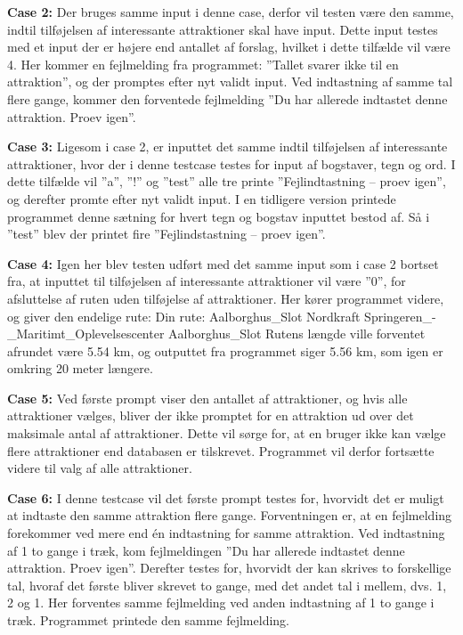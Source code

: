\textbf{Case 2:} \newline
Der bruges samme input i denne case, derfor vil testen være den samme, indtil tilføjelsen af interessante attraktioner skal have input. Dette input testes med et input der er højere end antallet af forslag, hvilket i dette tilfælde vil være 4. Her kommer en fejlmelding fra programmet: ”Tallet svarer ikke til en attraktion”, og der promptes efter nyt validt input. Ved indtastning af samme tal flere gange, kommer den forventede fejlmelding ”Du har allerede indtastet denne attraktion. Proev igen”.

\textbf{Case 3:} \newline
Ligesom i case 2, er inputtet det samme indtil tilføjelsen af interessante attraktioner, hvor der i denne testcase testes for input af bogstaver, tegn og ord. I dette tilfælde vil ”a”, ”!” og ”test” alle tre printe ”Fejlindtastning – proev igen”, og derefter promte efter nyt validt input. I en tidligere version printede programmet denne sætning for hvert tegn og bogstav inputtet bestod af. Så i ”test” blev der printet fire ”Fejlindstastning – proev igen”. 

\textbf{Case 4:} \newline
Igen her blev testen udført med det samme input som i case 2 bortset fra, at inputtet til tilføjelsen af interessante attraktioner vil være ”0”, for afsluttelse af ruten uden tilføjelse af attraktioner. Her kører programmet videre, og giver den endelige rute: \newline
Din rute:\newline
Aalborghus\_Slot\newline
Nordkraft\newline
Springeren\_-\_Maritimt\_Oplevelsescenter\newline
Aalborghus\_Slot\newline
Rutens længde ville forventet afrundet være 5.54 km, og outputtet fra programmet siger 5.56 km, som igen er omkring 20 meter længere.

\textbf{Case 5:} \newline
Ved første prompt viser den antallet af attraktioner, og hvis alle attraktioner vælges, bliver der ikke promptet for en attraktion ud over det maksimale antal af attraktioner. Dette vil sørge for, at en bruger ikke kan vælge flere attraktioner end databasen er tilskrevet. Programmet vil derfor fortsætte videre til valg af alle attraktioner.

\textbf{Case 6:} \newline
I denne testcase vil det første prompt testes for, hvorvidt det er muligt at indtaste den samme attraktion flere gange. Forventningen er, at en fejlmelding forekommer ved mere end én indtastning for samme attraktion. Ved indtastning af 1 to gange i træk, kom fejlmeldingen ”Du har allerede indtastet denne attraktion. Proev igen”. Derefter testes for, hvorvidt der kan skrives to forskellige tal, hvoraf det første bliver skrevet to gange, med det andet tal i mellem, dvs. 1, 2 og 1. Her forventes samme fejlmelding ved anden indtastning af 1 to gange i træk. Programmet printede den samme fejlmelding.

